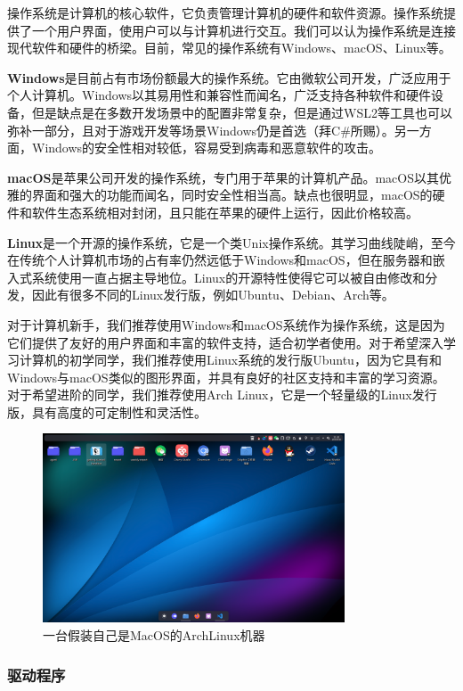 \documentclass[../main.tex]{subfiles}
\begin{document}
操作系统是计算机的核心软件，它负责管理计算机的硬件和软件资源。操作系统提供了一个用户界面，使用户可以与计算机进行交互。我们可以认为操作系统是连接现代软件和硬件的桥梁。目前，常见的操作系统有Windows、macOS、Linux等。

\textbf{Windows}是目前占有市场份额最大的操作系统。它由微软公司开发，广泛应用于个人计算机。Windows以其易用性和兼容性而闻名，广泛支持各种软件和硬件设备，但是缺点是在多数开发场景中的配置非常复杂，但是通过WSL2等工具也可以弥补一部分，且对于游戏开发等场景Windows仍是首选（拜C\#所赐）。另一方面，Windows的安全性相对较低，容易受到病毒和恶意软件的攻击。

\textbf{macOS}是苹果公司开发的操作系统，专门用于苹果的计算机产品。macOS以其优雅的界面和强大的功能而闻名，同时安全性相当高。缺点也很明显，macOS的硬件和软件生态系统相对封闭，且只能在苹果的硬件上运行，因此价格较高。

\textbf{Linux}是一个开源的操作系统，它是一个类Unix操作系统。其学习曲线陡峭，至今在传统个人计算机市场的占有率仍然远低于Windows和macOS，但在服务器和嵌入式系统使用一直占据主导地位。Linux的开源特性使得它可以被自由修改和分发，因此有很多不同的Linux发行版，例如Ubuntu、Debian、Arch等。

对于计算机新手，我们推荐使用Windows和macOS系统作为操作系统，这是因为它们提供了友好的用户界面和丰富的软件支持，适合初学者使用。对于希望深入学习计算机的初学同学，我们推荐使用Linux系统的发行版Ubuntu，因为它具有和Windows与macOS类似的图形界面，并具有良好的社区支持和丰富的学习资源。对于希望进阶的同学，我们推荐使用Arch Linux，它是一个轻量级的Linux发行版，具有高度的可定制性和灵活性。

\begin{figure}[ht]
  \centering
  \includegraphics[width=0.8\textwidth]{images/fake-mac.png}
  \caption{一台假装自己是MacOS的ArchLinux机器}
\end{figure}

\subsubsection{驱动程序}
\end{document}
